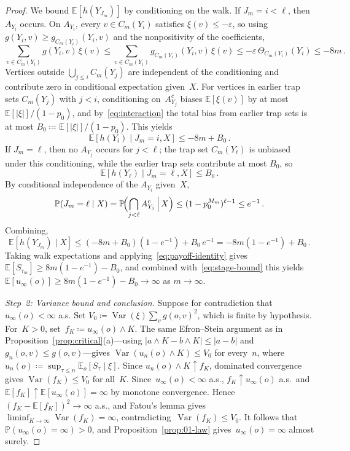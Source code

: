 \documentclass[aop]{imsart}
\theoremstyle{plain}
\theoremstyle{definition}
\newcommand{\E}{\mathbb{E}}
\renewcommand{\P}{\mathbb{P}}
\DeclareMathOperator{\var}{Var}
\begin{document}
\begin{proof}
		We bound $\E[h(Y_{J_m})]$ by conditioning on the walk. If $J_m=i<\ell$, then $A_{Y_i}$ occurs. On $A_{Y_i}$, every $v\in C_m(Y_i)$ satisfies $\xi(v)\leq-\varepsilon$, so using $g(Y_i,v)\geq g_{C_m(Y_i)}(Y_i,v)$ and the nonpositivity of the coefficients,
		\[
		\sum_{v\in C_m(Y_i)}g(Y_i,v)\,\xi(v)\leq\sum_{v\in C_m(Y_i)}g_{C_m(Y_i)}(Y_i,v)\,\xi(v)\leq -\varepsilon\,\Theta_{C_m(Y_i)}(Y_i)\leq -8m\,.
		\]
		Vertices outside $\bigcup_{j\leq i}C_m(Y_j)$ are independent of the conditioning and contribute zero in conditional expectation given~$X$. For vertices in earlier trap sets $C_m(Y_j)$ with $j<i$, conditioning on~$A_{Y_j}^c$ biases $\E[\xi(v)]$ by at most $\E[|\xi|]/(1-p_0)$, and by~\eqref{eq:interaction} the total bias from earlier trap sets is at most $B_0\coloneqq\E[|\xi|]/(1-p_0)$. This yields
		\[
		\E[h(Y_i)\mid J_m=i,X]\leq -8m+B_0\,.
		\]
		If $J_m=\ell$, then no $A_{Y_j}$ occurs for $j<\ell$; the trap set $C_m(Y_\ell)$ is unbiased under this conditioning, while the earlier trap sets contribute at most $B_0$, so
		\[
		\E[h(Y_\ell)\mid J_m=\ell,X]\leq B_0\,.
		\]
		By conditional independence of the $A_{Y_i}$ given~$X$,
		\[
		\P(J_m=\ell\mid X)=\P\!\Bigl(\bigcap_{j<\ell}A_{Y_j}^c\,\Big|\,X\Bigr)\leq(1-p_0^{M_m})^{\ell-1}\leq e^{-1}\,.
		\]
		Combining,
		\[
		\E[h(Y_{J_m})\mid X]\leq(-8m+B_0)(1-e^{-1})+B_0\,e^{-1}=-8m(1-e^{-1})+B_0\,.
		\]
		Taking walk expectations and applying~\eqref{eq:payoff-identity} gives $\E[S_{\tau_m}]\geq 8m(1-e^{-1})-B_0$, and combined with~\eqref{eq:stage-bound} this yields $\E[u_\infty(o)]\geq 8m(1-e^{-1})-B_0\to\infty$ as $m\to\infty$.
		
		\medskip
		
		\emph{Step~2: Variance bound and conclusion.}
		Suppose for contradiction that $u_\infty(o)<\infty$ a.s. Set $V_0\coloneqq\var(\xi)\sum_v g(o,v)^2$, which is finite by hypothesis.
		For~$K>0$, set~$f_K\coloneqq u_\infty(o)\wedge K$. The same Efron--Stein argument as in Proposition~\ref{prop:critical}(a)---using $|a\wedge K-b\wedge K|\leq|a-b|$ and $g_n(o,v)\leq g(o,v)$---gives $\var(u_n(o)\wedge K)\leq V_0$ for every~$n$, where $u_n(o)\coloneqq\sup_{\tau\leq n}\E_o[S_\tau\mid\xi]$. Since $u_n(o)\wedge K\uparrow f_K$, dominated convergence gives $\var(f_K)\leq V_0$ for all~$K$.
		Since~$u_\infty(o)<\infty$ a.s., $f_K\uparrow u_\infty(o)$ a.s.\ and~$\E[f_K]\uparrow\E[u_\infty(o)]=\infty$ by monotone convergence.
		Hence~$(f_K-\E[f_K])^2\to\infty$ a.s., and Fatou's lemma gives~$\liminf_{K\to\infty}\var(f_K)=\infty$, contradicting~$\var(f_K)\leq V_0$.
		It follows that~$\P(u_\infty(o)=\infty)>0$, and Proposition~\ref{prop:01-law} gives~$u_\infty(o)=\infty$ almost surely.
	\end{proof}
	
\end{document}
